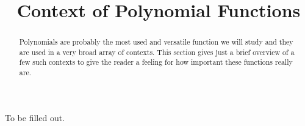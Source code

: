 \documentclass{ximeraXloud}
\title{Context of Polynomial Functions}
\begin{document}
\begin{abstract}
    Polynomials are probably the most used and versatile function we will study and they are used in a very broad array of contexts. This section gives just a brief overview of a few such contexts to give the reader a feeling for how important these functions really are.
\end{abstract}
\maketitle
To be filled out.

%
%
%
%
%
\end{document}
